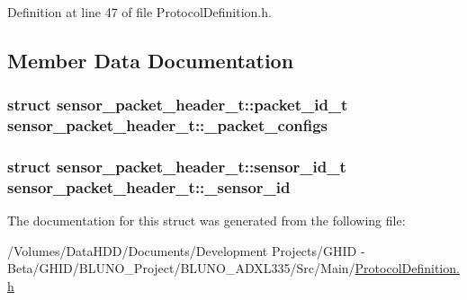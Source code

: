 \-Definition at line 47 of file \-Protocol\-Definition.\-h.



\subsection{\-Member \-Data \-Documentation}
\hypertarget{structsensor__packet__header__t_a4e5e38459edaa1955085958204b2ccfa}{
\subsubsection[{\-\_\-packet\-\_\-configs}]{\setlength{\rightskip}{0pt plus 5cm}struct {\bf sensor\-\_\-packet\-\_\-header\-\_\-t\-::packet\-\_\-id\-\_\-t}  {\bf sensor\-\_\-packet\-\_\-header\-\_\-t\-::\-\_\-packet\-\_\-configs}}}\label{structsensor__packet__header__t_a4e5e38459edaa1955085958204b2ccfa}
\hypertarget{structsensor__packet__header__t_afcdc03dc84384733134e6334eb9aad2b}{
\subsubsection[{\-\_\-sensor\-\_\-id}]{\setlength{\rightskip}{0pt plus 5cm}struct {\bf sensor\-\_\-packet\-\_\-header\-\_\-t\-::sensor\-\_\-id\-\_\-t}  {\bf sensor\-\_\-packet\-\_\-header\-\_\-t\-::\-\_\-sensor\-\_\-id}}}\label{structsensor__packet__header__t_afcdc03dc84384733134e6334eb9aad2b}


\-The documentation for this struct was generated from the following file\-:\begin{DoxyCompactItemize}
\item 
/\-Volumes/\-Data\-H\-D\-D/\-Documents/\-Development Projects/\-G\-H\-I\-D -\/ Beta/\-G\-H\-I\-D/\-B\-L\-U\-N\-O\-\_\-\-Project/\-B\-L\-U\-N\-O\-\_\-\-A\-D\-X\-L335/\-Src/\-Main/\hyperlink{_protocol_definition_8h}{\-Protocol\-Definition.\-h}\end{DoxyCompactItemize}
